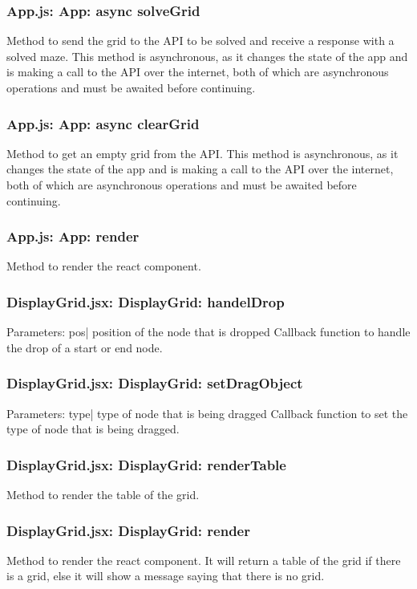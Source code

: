 \documentclass{article}
\begin{document}
\subsubsection{App.js: App: async solveGrid}
Method to send the grid to the API to be solved and receive a response with a solved maze. This method is asynchronous, as it changes the state of the app and is making a call to the API over the internet, both of which are asynchronous operations and must be awaited before continuing.

\subsubsection{App.js: App: async clearGrid}
Method to get an empty grid from the API. This method is asynchronous, as it changes the state of the app and is making a call to the API over the internet, both of which are asynchronous operations and must be awaited before continuing.

\subsubsection{App.js: App: render}
Method to render the react component.

\subsubsection{DisplayGrid.jsx: DisplayGrid: handelDrop}
Parameters:\newline
\indent pos| position of the node that is dropped\newline
Callback function to handle the drop of a start or end node.

\subsubsection{DisplayGrid.jsx: DisplayGrid: setDragObject}
Parameters:\newline
\indent type| type of node that is being dragged\newline
Callback function to set the type of node that is being dragged.

\subsubsection{DisplayGrid.jsx: DisplayGrid: renderTable}
Method to render the table of the grid.

\subsubsection{DisplayGrid.jsx: DisplayGrid: render}
Method to render the react component. It will return a table of the grid if there is a grid, else it will show a message saying that there is no grid.
\end{document}
